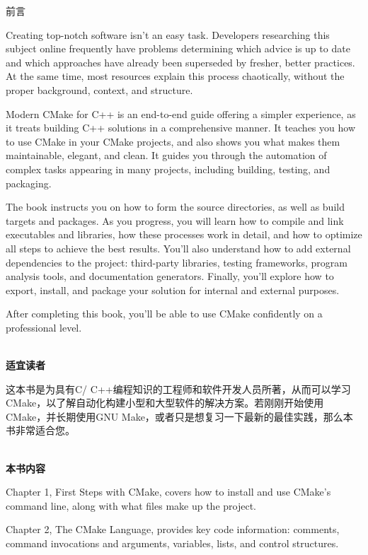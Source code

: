\begin{flushright}
	 前言
\end{flushright}

Creating top-notch software isn't an easy task. Developers researching this subject online frequently have problems determining which advice is up to date and which approaches have already been superseded by fresher, better practices. At the same time, most resources explain this process chaotically, without the proper background, context, and structure.

Modern CMake for C++ is an end-to-end guide offering a simpler experience, as it treats building C++ solutions in a comprehensive manner. It teaches you how to use CMake in your CMake projects, and also shows you what makes them maintainable, elegant, and clean. It guides you through the automation of complex tasks appearing in many projects, including building, testing, and packaging.

The book instructs you on how to form the source directories, as well as build targets and packages. As you progress, you will learn how to compile and link executables and libraries, how these processes work in detail, and how to optimize all steps to achieve the best results. You'll also understand how to add external dependencies to the project: third-party libraries, testing frameworks, program analysis tools, and documentation generators. Finally, you'll explore how to export, install, and package your solution for internal and external purposes.

After completing this book, you'll be able to use CMake confidently on a professional level.

\hspace*{\fill} \\ %
\textbf{适宜读者}

这本书是为具有C/ C++编程知识的工程师和软件开发人员所著，从而可以学习CMake，以了解自动化构建小型和大型软件的解决方案。若刚刚开始使用CMake，并长期使用GNU Make，或者只是想复习一下最新的最佳实践，那么本书非常适合您。

\hspace*{\fill} \\ %
\textbf{本书内容}

Chapter 1, First Steps with CMake, covers how to install and use CMake's command line, along with what files make up the project.

Chapter 2, The CMake Language, provides key code information: comments, command invocations and arguments, variables, lists, and control structures.


